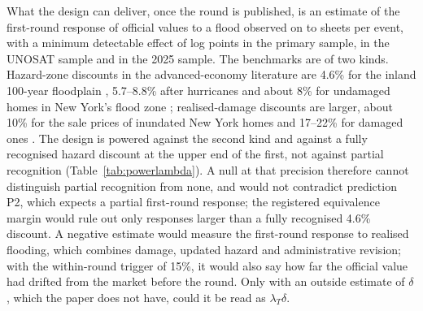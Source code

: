 What the design can deliver, once the round is published, is an estimate of the first-round response of official values to a flood observed on \radarTreated{} to \evTreated{} sheets per event, with a minimum detectable effect of \regMdePooled{} log points in the primary sample, \unoMdeW{} in the UNOSAT sample and \evMdeW{} in the 2025 sample. The benchmarks are of two kinds. Hazard-zone discounts in the advanced-economy literature are 4.6\% for the inland 100-year floodplain \citep{beltran2018flood}, 5.7--8.8\% after hurricanes \citep{bin2013changes} and about 8\% for undamaged homes in New York's flood zone \citep{ortega2018rising}; realised-damage discounts are larger, about 10\% for the sale prices of inundated New York homes \citep{guo2026rising} and 17--22\% for damaged ones \citep{ortega2018rising}. The design is powered against the second kind and against a fully recognised hazard discount at the upper end of the first, not against partial recognition (Table~\ref{tab:powerlambda}). A null at that precision therefore cannot distinguish partial recognition from none, and would not contradict prediction P2, which expects a partial first-round response; the registered equivalence margin would rule out only responses larger than a fully recognised 4.6\% discount. A negative estimate would measure the first-round response to realised flooding, which combines damage, updated hazard and administrative revision; with the within-round trigger of 15\%, it would also say how far the official value had drifted from the market before the round. Only with an outside estimate of $\delta$, which the paper does not have, could it be read as $\lambda_T\delta$.
